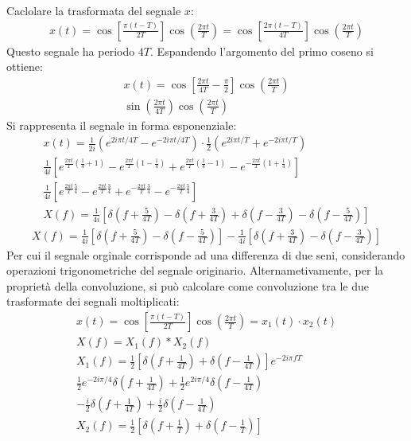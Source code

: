 \documentclass{article}
\begin{document}
Caclolare la trasformata del segnale $x$:
\begin{gather*}
    x(t)=\cos\left[\displaystyle\frac{\pi(t-T)}{2T}\right]\cos\left(\frac{2\pi t}{T}\right)=\cos\left[\displaystyle\frac{2\pi(t-T)}{4T}\right]\cos\left(\frac{2\pi t}{T}\right)
\end{gather*}
Questo segnale ha periodo $4T$. Espandendo l'argomento del primo coseno si ottiene:
\begin{gather*}
    x(t)=\displaystyle\cos\left[\frac{2\pi t}{4T}-\frac{\pi}{2}\right]\cos\left(\frac{2\pi t}{T}\right)\\
    \sin\left(\displaystyle\frac{2\pi t}{4T}\right)\cos\left(\frac{2\pi t}{T}\right)
\end{gather*}
Si rappresenta il segnale in forma esponenziale:
\begin{gather*}
    x(t)=\displaystyle\frac{1}{2i}\left(e^{2i\pi t/4T}-e^{-2i\pi t/4T}\right)\cdot\displaystyle\frac{1}{2}\left(e^{2i\pi t/T}+e^{-2i\pi t/T}\right)\\
    \displaystyle\frac{1}{4i}\left[e^{\frac{2\pi t}{T}\left(\frac{1}{4}+1\right)}-e^{\frac{2\pi t}{T}\left(1-\frac{1}{4}\right)}+e^{\frac{2\pi t}{T}\left(\frac{1}{4}-1\right)}-e^{-\frac{2\pi t}{T}\left(1+\frac{1}{4}\right)}\right]\\
    \displaystyle\frac{1}{4i}\left[e^{\frac{2\pi t}{T}\frac{5}{4}}-e^{\frac{2\pi t}{T}\frac{3}{4}}+e^{-\frac{2\pi t}{T}\frac{3}{4}}-e^{-\frac{2\pi t}{T}\frac{5}{4}}\right]\\
    X(f)=\displaystyle\frac{1}{4i}\left[\delta\left(f+\frac{5}{4T}\right)-\delta\left(f+\frac{3}{4T}\right)+\delta\left(f-\frac{3}{4T}\right)-\delta\left(f-\frac{5}{4T}\right)\right]
\end{gather*}
\begin{gather}
    X(f)=\displaystyle\frac{1}{4i}\left[\delta\left(f+\frac{5}{4T}\right)-\delta\left(f-\frac{5}{4T}\right)\right]-\frac{1}{4i}\left[\delta\left(f+\frac{3}{4T}\right)-\delta\left(f-\frac{3}{4T}\right)\right]
\end{gather}
Per cui il segnale orginale corrisponde ad una differenza di due seni, considerando operazioni trigonometriche del segnale originario. Alternametivamente, per la 
proprietà della convoluzione, si può calcolare come convoluzione tra le due trasformate dei segnali moltiplicati:
\begin{gather*}
    x(t)=\cos\left[\displaystyle\frac{\pi(t-T)}{2T}\right]\cos\left(\frac{2\pi t}{T}\right)=x_1(t)\cdot x_2(t)\\
    X(f)=X_1(f)*X_2(f)\\
    X_1(f)=\displaystyle\frac{1}{2}\left[\delta\left(f+\frac{1}{4T}\right)+\delta\left(f-\frac{1}{4T}\right)\right]e^{-2i\pi fT}\\
    \displaystyle\frac{1}{2}e^{-2i\pi/4}\delta\left(f+\frac{1}{4T}\right)+\frac{1}{2}e^{2i\pi /4}\delta\left(f-\frac{1}{4T}\right)\\
    \displaystyle-\frac{i}{2}\delta\left(f+\frac{1}{4T}\right)+\frac{i}{2}\delta\left(f-\frac{1}{4T}\right)\\
    X_2(f)=\displaystyle\frac{1}{2}\left[\delta\left(f+\frac{1}{T}\right)+\delta\left(f-\frac{1}{T}\right)\right]
\end{gather*}
\end{document}
